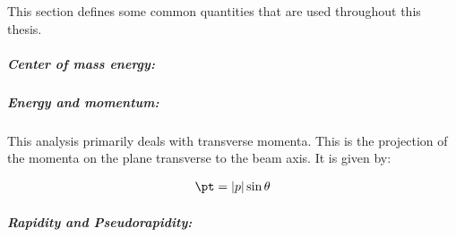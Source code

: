 
This section defines some common quantities that are used throughout this thesis.

\subparagraph{Center of mass energy:}

\subparagraph{Energy and momentum:}
This analysis primarily deals with transverse momenta.
This is the projection of the momenta on the plane transverse to the beam axis. 
It is given by:

\begin{align}
\pt = |p| \sin\theta
\end{align}
\subparagraph{Rapidity and Pseudorapidity:}
